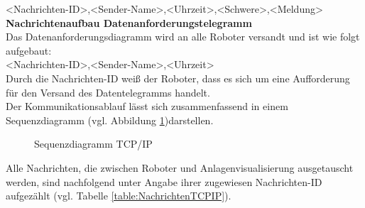 \documentclass[ a4paper,
                oneside,
                toc=bibliography,
                toc=listof
                ]{scrbook}
\begin{document}
	<Nachrichten-ID>,<Sender-Name>,<Uhrzeit>,<Schwere>,<Meldung>\\
	\textbf{Nachrichtenaufbau Datenanforderungstelegramm}\\
	Das Datenanforderungsdiagramm wird an alle Roboter versandt und ist wie folgt aufgebaut:\\
	<Nachrichten-ID>,<Sender-Name>,<Uhrzeit>\\
	Durch die Nachrichten-ID weiß der Roboter, dass es sich um eine Aufforderung für den Versand des Datentelegramms handelt. \\
	Der Kommunikationsablauf lässt sich zusammenfassend in einem Sequenzdiagramm (vgl. Abbildung \ref{fig:seqTCPIP})darstellen.

	\begin{figure}
		\centering
		\caption{Sequenzdiagramm TCP/IP}
		\label{fig:seqTCPIP}
	\end{figure}
	Alle Nachrichten, die zwischen Roboter und Anlagenvisualisierung ausgetauscht werden, sind nachfolgend unter Angabe ihrer zugewiesen Nachrichten-ID aufgezählt (vgl. Tabelle \ref{table:NachrichtenTCPIP}).
\end{document}

